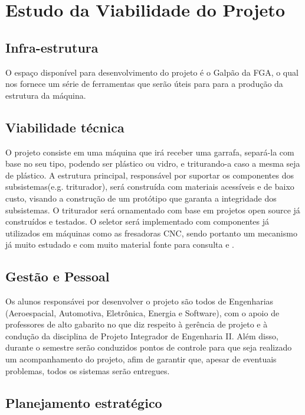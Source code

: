 \section{Estudo da Viabilidade do Projeto}

\subsection{Infra-estrutura}
    O espaço disponível para desenvolvimento do projeto é o Galpão da FGA, o qual nos fornece um série de ferramentas que serão úteis para para a produção da estrutura da máquina.

\subsection{Viabilidade técnica}
    O projeto consiste em uma máquina que irá receber uma garrafa, separá-la com base no seu tipo, podendo ser plástico ou vidro, e triturando-a caso a mesma seja de plástico. A estrutura principal, responsável por suportar os componentes dos subsistemas(e.g. triturador), será construída com materiais acessíveis e de baixo custo, visando a construção de um protótipo que garanta a integridade dos subsistemas. O triturador será ornamentado com base em projetos open source já construídos e testados\cite{preciousplastic}. O seletor será implementado com componentes já utilizados em máquinas como as fresadoras CNC, sendo portanto um mecanismo já muito estudado e com muito material fonte para consulta \cite{hacksterDamian} e \cite{hacksterArduino}.

\subsection{Gestão e Pessoal}
    Os alunos responsávei por desenvolver o projeto são todos de Engenharias (Aeroespacial, Automotiva, Eletrônica, Energia e Software), com o apoio de professores de alto gabarito no que diz respeito à gerência de projeto e à condução da disciplina de Projeto Integrador de Engenharia II. Além disso, durante o semestre serão conduzidos pontos de controle para que seja realizado um acompanhamento do projeto, afim de garantir que, apesar de eventuais problemas, todos os sistemas serão entregues.

\subsection{Planejamento estratégico}

